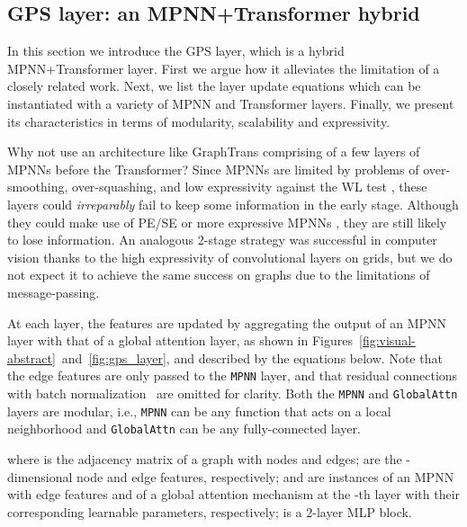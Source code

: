 \documentclass{article}
\begin{document}
\subsection{GPS layer: an MPNN+Transformer hybrid}\label{sec:gps_layer}


In this section we introduce the GPS layer, which is a hybrid MPNN+Transformer layer. First we argue how it alleviates the limitation of a closely related work. Next, we list the layer update equations which can be instantiated with a variety of MPNN and Transformer layers. Finally, we present its characteristics in terms of modularity, scalability and expressivity.





 Why not use an architecture like GraphTrans \cite{jain2021graphtrans} comprising of a few layers of MPNNs before the Transformer? Since MPNNs are limited by problems of over-smoothing, over-squashing, and low expressivity against the WL test \cite{alon2021on,topping2021understanding_ricci}, these layers could \textit{irreparably} fail to keep some information in the early stage. Although they could make use of PE/SE or more expressive MPNNs \cite{beaini2021directional_dgn, dwivedi2022LPE}, they are still likely to lose information. An analogous 2-stage strategy was successful in computer vision \cite{dascoli2021convit, guo2021cmt} thanks to the high expressivity of convolutional layers on grids, but we do not expect it to achieve the same success on graphs due to the limitations of message-passing.


\newcommand{\mpnn}{\texttt{MPNN}\xspace}
\newcommand{\attn}{\texttt{GlobalAttn}\xspace}
\newcommand{\X}{\mathbf{X}}
\newcommand{\E}{\mathbf{E}}
\newcommand{\A}{\mathbf{A}}
At each layer, the features are updated by aggregating the output of an MPNN layer with that of a global attention layer, as shown in Figures~\ref{fig:visual-abstract}~and~\ref{fig:gps_layer}, and described by the equations below. Note that the edge features are only passed to the \mpnn layer, and that residual connections with batch normalization~\cite{ioffe2015batchnorm} are omitted for clarity. Both the \mpnn and \attn layers are modular, i.e., \mpnn can be any function that acts on a local neighborhood and \attn can be any fully-connected layer.
\vspace{-3pt}

where  is the adjacency matrix of a graph with  nodes and  edges;  are the -dimensional node and edge features, respectively;  and  are instances of an MPNN with edge features and of a global attention mechanism at the -th layer with their corresponding learnable parameters, respectively;  is a 2-layer MLP block.
\end{document}
